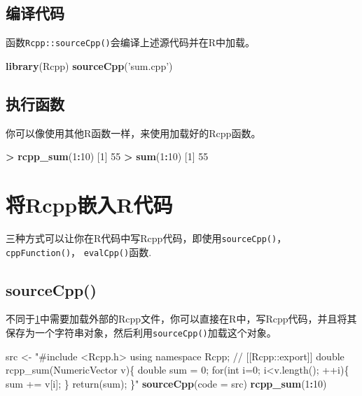 \documentclass[]{ctexbook}
\newenvironment{Shaded}{\begin{snugshade}}{\end{snugshade}}
\newcommand{\KeywordTok}[1]{\textcolor[rgb]{0.13,0.29,0.53}{\textbf{#1}}}
\newcommand{\DataTypeTok}[1]{\textcolor[rgb]{0.13,0.29,0.53}{#1}}
\newcommand{\DecValTok}[1]{\textcolor[rgb]{0.00,0.00,0.81}{#1}}
\newcommand{\StringTok}[1]{\textcolor[rgb]{0.31,0.60,0.02}{#1}}
\newcommand{\OperatorTok}[1]{\textcolor[rgb]{0.81,0.36,0.00}{\textbf{#1}}}
\newcommand{\NormalTok}[1]{#1}
\begin{document}
\section{编译代码}\label{compile}

函数\texttt{Rcpp::sourceCpp()}会编译上述源代码并在R中加载。

\begin{Shaded}
\begin{Highlighting}[]
\KeywordTok{library}\NormalTok{(Rcpp)}
\KeywordTok{sourceCpp}\NormalTok{(}\StringTok{'sum.cpp'}\NormalTok{)}
\end{Highlighting}
\end{Shaded}

\section{执行函数}\label{Execute}

你可以像使用其他R函数一样，来使用加载好的Rcpp函数。

\begin{Shaded}
\begin{Highlighting}[]
\OperatorTok{>}\StringTok{ }\KeywordTok{rcpp_sum}\NormalTok{(}\DecValTok{1}\OperatorTok{:}\DecValTok{10}\NormalTok{)}
\NormalTok{[}\DecValTok{1}\NormalTok{] }\DecValTok{55}
\OperatorTok{>}\StringTok{ }\KeywordTok{sum}\NormalTok{(}\DecValTok{1}\OperatorTok{:}\DecValTok{10}\NormalTok{)}
\NormalTok{[}\DecValTok{1}\NormalTok{] }\DecValTok{55}
\end{Highlighting}
\end{Shaded}

\chapter{将Rcpp嵌入R代码}\label{embedd}

三种方式可以让你在R代码中写Rcpp代码，即使用\texttt{sourceCpp()}，
\texttt{cppFunction()}， \texttt{evalCpp()}函数.

\section{sourceCpp()}\label{sourcecpp}

不同于\ref{compile}中需要加载外部的Rcpp文件，你可以直接在R中，写Rcpp代码，并且将其保存为一个字符串对象，然后利用\texttt{sourceCpp()}加载这个对象。

\begin{Shaded}
\begin{Highlighting}[]
\NormalTok{src <-}
\StringTok{"#include <Rcpp.h>}
\StringTok{using namespace Rcpp;}
\StringTok{// [[Rcpp::export]]}
\StringTok{double rcpp_sum(NumericVector v)\{}
\StringTok{  double sum = 0;}
\StringTok{  for(int i=0; i<v.length(); ++i)\{}
\StringTok{    sum += v[i];}
\StringTok{  \}}
\StringTok{  return(sum);}
\StringTok{\}"}
\KeywordTok{sourceCpp}\NormalTok{(}\DataTypeTok{code =}\NormalTok{ src)}
\KeywordTok{rcpp_sum}\NormalTok{(}\DecValTok{1}\OperatorTok{:}\DecValTok{10}\NormalTok{)}
\end{Highlighting}
\end{Shaded}
\end{document}
